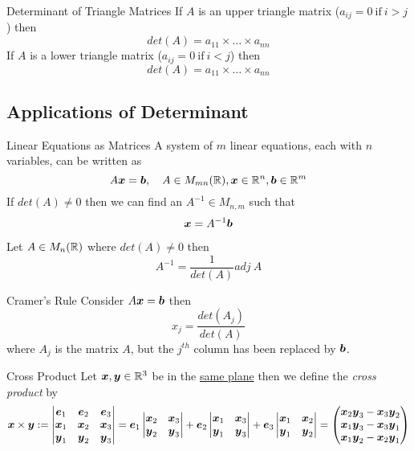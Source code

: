 \documentclass[11pt,a4paper]{article}
\begin{document}
\subtitle{Remark 6.11 - }{Determinant of Triangle Matrices}
If $A$ is an upper triangle matrix ($a_{ij} = 0 \mathrm{\ if\ } i > j$) then $$det(A) = a_{11} \times \dots \times a_{nn}$$
If $A$ is a lower triangle matrix ($a_{ij} = 0 \mathrm{\ if\ } i < j$) then $$det(A) = a_{11} \times \dots \times a_{nn}$$

\subsection{Applications of Determinant}

\subtitle{Theorem 6.12 - }{Linear Equations as Matrices}
A system of $m$ linear equations, each with $n$ variables, can be written as $$A\boldsymbol{x} = \boldsymbol{b},\quad A \in M_{mn}(\mathbb{R}), \boldsymbol{x} \in \mathbb{R}^n, \boldsymbol{b} \in \mathbb{R}^m$$
If $det(A) \not = 0$ then we can find an $A^{-1} \in M_{n,m}$ such that $$\boldsymbol{x} = A^{-1}\boldsymbol{b}$$

\subtitle{Theorem 6.13}{}
Let $A \in M_n(\mathbb{R})$ where $det(A) \not = 0$ then $$A^{-1} = \frac{1}{det(A)}adj\ A$$

\subtitle{Theorem 6.14 - }{Cramer's Rule}
Consider $A\boldsymbol{x} = \boldsymbol{b}$ then $$x_j = \frac{det(A_j)}{det(A)}$$ where $A_j$ is the matrix $A$, but the $j^{th}$ column has been replaced by $\boldsymbol{b}$. \\

\subtitle{Definition 6.15 - }{Cross Product}
Let $\boldsymbol{x}, \boldsymbol{y} \in \mathbb{R}^3$ be in the \underline{same plane} then we define the \textit{cross product} by
$$\boldsymbol{x} \times \boldsymbol{y} := \begin{vmatrix}
  \boldsymbol{e}_1 & \boldsymbol{e}_2 & \boldsymbol{e}_3 \\
  \boldsymbol{x}_1 & \boldsymbol{x}_2 & \boldsymbol{x}_3 \\
  \boldsymbol{y}_1 & \boldsymbol{y}_2 & \boldsymbol{y}_3
\end{vmatrix} = \boldsymbol{e}_1 \begin{vmatrix}
  \boldsymbol{x}_2 & \boldsymbol{x}_3 \\
  \boldsymbol{y}_2 & \boldsymbol{y}_3
\end{vmatrix} + \boldsymbol{e}_2 \begin{vmatrix}
  \boldsymbol{x}_1 & \boldsymbol{x}_3 \\
  \boldsymbol{y}_1 & \boldsymbol{y}_3
\end{vmatrix} +  \boldsymbol{e}_3 \begin{vmatrix}
  \boldsymbol{x}_1 & \boldsymbol{x}_2 \\
  \boldsymbol{y}_1 & \boldsymbol{y}_2
\end{vmatrix} = \begin{pmatrix}
  \boldsymbol{x}_2\boldsymbol{y}_3 - \boldsymbol{x}_3\boldsymbol{y}_2 \\
  \boldsymbol{x}_1\boldsymbol{y}_3 - \boldsymbol{x}_3\boldsymbol{y}_1 \\
  \boldsymbol{x}_1\boldsymbol{y}_2 - \boldsymbol{x}_2\boldsymbol{y}_1
\end{pmatrix}$$
\end{document}
